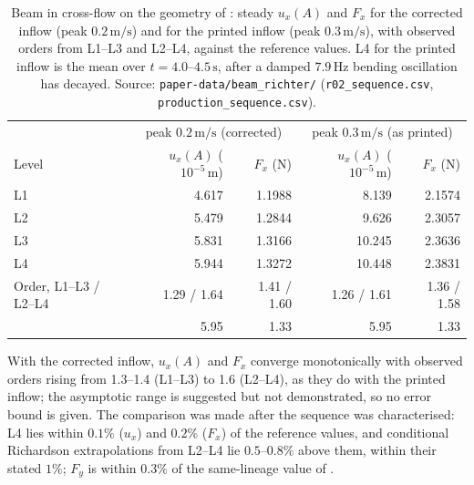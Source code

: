 \documentclass[sn-mathphys,Numbered]{sn-jnl}%
\begin{document}
\begin{appendices}
\begin{table}[htbp]
	\centering
	\footnotesize
	\caption{Beam in cross-flow on the geometry of \citet{Richter2012}: steady $u_x(A)$ and $F_x$ for the corrected inflow (peak $0.2\,\mathrm{m/s}$) and for the printed inflow (peak $0.3\,\mathrm{m/s}$), with observed orders from L1--L3 and L2--L4, against the reference values. L4 for the printed inflow is the mean over $t = 4.0$--$4.5\,\mathrm{s}$, after a damped $7.9\,\mathrm{Hz}$ bending oscillation has decayed. Source: \texttt{paper-data/beam\_richter/} (\texttt{r02\_sequence.csv}, \texttt{production\_sequence.csv}).}
	\label{tab:beam_seq}
	\begin{tabular}{lrrrr}
		\toprule
		& \multicolumn{2}{c}{peak $0.2\,\mathrm{m/s}$ (corrected)} & \multicolumn{2}{c}{peak $0.3\,\mathrm{m/s}$ (as printed)} \\
		Level & $u_x(A)$ ($10^{-5}\,\mathrm{m}$) & $F_x$ (N) & $u_x(A)$ ($10^{-5}\,\mathrm{m}$) & $F_x$ (N) \\
		\midrule
		L1 & 4.617 & 1.1988 & 8.139 & 2.1574 \\
		L2 & 5.479 & 1.2844 & 9.626 & 2.3057 \\
		L3 & 5.831 & 1.3166 & 10.245 & 2.3636 \\
		L4 & 5.944 & 1.3272 & 10.448 & 2.3831 \\
		\midrule
		Order, L1--L3 / L2--L4 & 1.29 / 1.64 & 1.41 / 1.60 & 1.26 / 1.61 & 1.36 / 1.58 \\
		\citet{Richter2012} & 5.95 & 1.33 & 5.95 & 1.33 \\
		\bottomrule
	\end{tabular}
\end{table}

With the corrected inflow, $u_x(A)$ and $F_x$ converge monotonically with observed orders rising from 1.3--1.4 (L1--L3) to 1.6 (L2--L4), as they do with the printed inflow; the asymptotic range is suggested but not demonstrated, so no error bound is given.
The comparison was made after the sequence was characterised: L4 lies within $0.1\%$ ($u_x$) and $0.2\%$ ($F_x$) of the reference values, and conditional Richardson extrapolations from L2--L4 lie $0.5$--$0.8\%$ above them, within their stated $1\%$; $F_y$ is within $0.3\%$ of the same-lineage value of \citet{Tukovic2018}.


\end{appendices}
\end{document}
